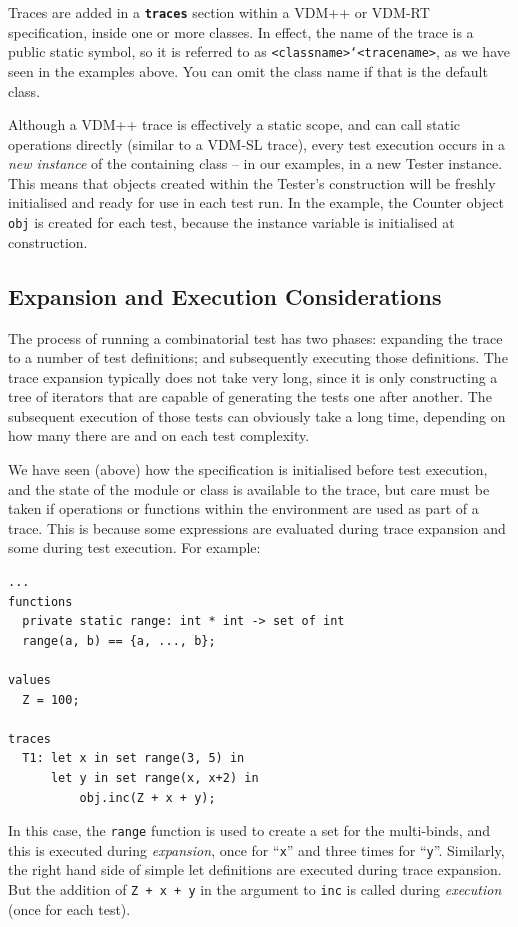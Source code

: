 \documentclass{overturerepchap}
\begin{document}
Traces are added in a \texttt{\textbf{traces}} section within a VDM++ or VDM-RT
specification, inside one or more classes. In effect, the name of the trace is
a public static symbol, so it is referred to as
\texttt{<classname>`<tracename>}, as we have seen in the examples above. You
can omit the class name if that is the default class.

Although a VDM++ trace is effectively a static scope, and can call static
operations directly (similar to a VDM-SL trace), every test execution occurs in
a \emph{new instance} of the containing class -- in our examples, in a new Tester
instance. This means that objects created within the Tester's construction will
be freshly initialised and ready for use in each test run. In the example, the
Counter object \texttt{obj} is created for each test, because the instance
variable is initialised at construction.

\subsection{Expansion and Execution Considerations}

The process of running a combinatorial test has two phases: expanding the trace
to a number of test definitions; and subsequently executing those definitions.
The trace expansion typically does not take very long, since it is only
constructing a tree of iterators that are capable of generating the tests one
after another. The subsequent execution of those tests can obviously take a long
time, depending on how many there are and on each test complexity.

We have seen (above) how the specification is initialised before test execution,
and the state of the module or class is available to the trace, but care must be
taken if operations or functions within the environment are used as part of a
trace. This is because some expressions are evaluated during trace expansion and
some during test execution. For example:

\small
\begin{lstlisting}
...
functions
  private static range: int * int -> set of int
  range(a, b) == {a, ..., b};

values
  Z = 100;

traces
  T1: let x in set range(3, 5) in
      let y in set range(x, x+2) in
          obj.inc(Z + x + y);
\end{lstlisting}
\normalsize

\noindent In this case, the \texttt{range} function is used to create a set for the
multi-binds, and this is executed during \emph{expansion}, once for ``\texttt{x}'' and three
times for ``\texttt{y}''. Similarly, the right hand side of simple let definitions are
executed during trace expansion. But the addition of \texttt{Z + x + y} in the
argument to \texttt{inc} is called during \emph{execution} (once for each test).
\end{document}
